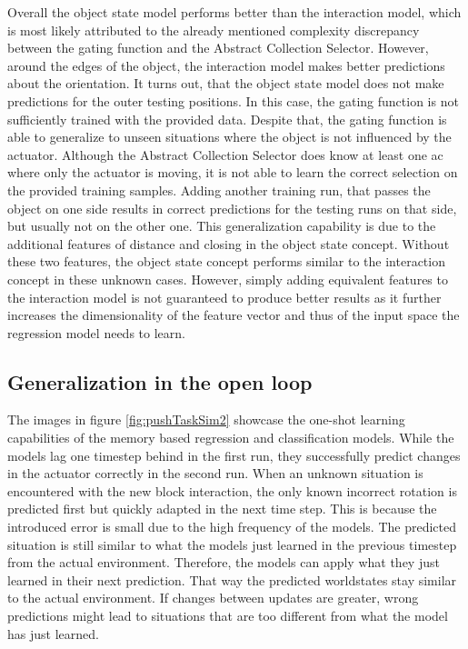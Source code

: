 Overall the object state model performs better than the interaction model, which is most likely attributed to the already mentioned complexity discrepancy between the gating function and the Abstract Collection Selector. 
However, around the edges of the object, the interaction model makes better predictions about the orientation. It turns out, that the object state model does not make predictions for the outer testing positions. In this case, the gating function is not sufficiently trained with the provided data.
Despite that, the gating function is able to generalize to unseen situations where the object is not influenced by the actuator. Although the Abstract Collection Selector does know at least one \gls{ac} where only the actuator is moving, it is not able to learn the correct selection on the provided training samples.
Adding another training run, that passes the object on one side results in correct predictions for the testing runs on that side, but usually not on the other one.
This generalization capability is due to the additional features of distance and closing in the object state concept. Without these two features, the object state concept performs similar to the interaction concept in these unknown cases.
However, simply adding equivalent features to the interaction model is not guaranteed to produce better results as it further increases the dimensionality of the feature vector and thus of the input space the regression model needs to learn. %


\subsection{Generalization in the open loop} %

The images in figure \ref{fig:pushTaskSim2} showcase the one-shot learning capabilities of the memory based regression and classification models. While the models lag one timestep behind in the first run, they successfully predict changes in the actuator correctly in the second run. When an unknown situation is encountered with the new block interaction, the only known incorrect rotation is predicted first but quickly adapted in the next time step. This is because the introduced error is small due to the high frequency of the models. The predicted situation is still similar to what the models just learned in the previous timestep from the actual environment. Therefore, the models can apply what they just learned in their next prediction. That way the predicted worldstates stay similar to the actual environment.
If changes between updates are greater, wrong predictions might lead to situations that are too different from what the model has just learned.

